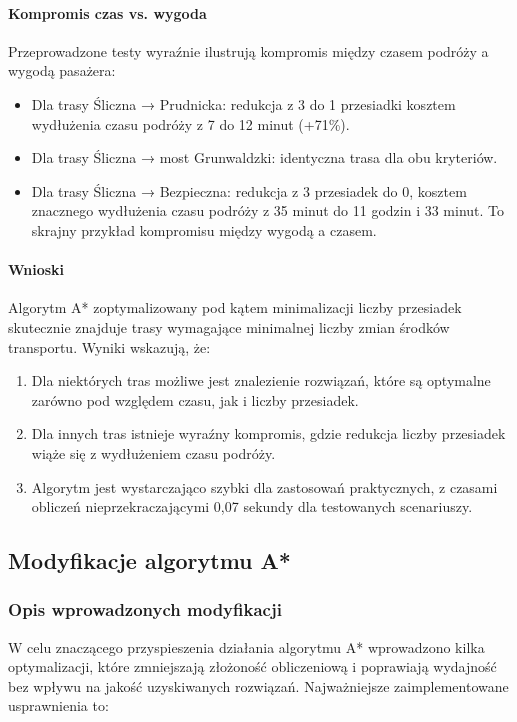 \documentclass[12pt,a4paper]{article}
\begin{document}
\paragraph{Kompromis czas vs. wygoda}
Przeprowadzone testy wyraźnie ilustrują kompromis między czasem podróży a wygodą pasażera:

\begin{itemize}
    \item Dla trasy Śliczna → Prudnicka: redukcja z 3 do 1 przesiadki kosztem wydłużenia czasu podróży z 7 do 12 minut (+71\%).
    \item Dla trasy Śliczna → most Grunwaldzki: identyczna trasa dla obu kryteriów.
    \item Dla trasy Śliczna → Bezpieczna: redukcja z 3 przesiadek do 0, kosztem znacznego wydłużenia czasu podróży z 35 minut do 11 godzin i 33 minut. To skrajny przykład kompromisu między wygodą a czasem.
\end{itemize}

\paragraph{Wnioski}
Algorytm A* zoptymalizowany pod kątem minimalizacji liczby przesiadek skutecznie znajduje trasy wymagające minimalnej liczby zmian środków transportu. Wyniki wskazują, że:

\begin{enumerate}
    \item Dla niektórych tras możliwe jest znalezienie rozwiązań, które są optymalne zarówno pod względem czasu, jak i liczby przesiadek.
    \item Dla innych tras istnieje wyraźny kompromis, gdzie redukcja liczby przesiadek wiąże się z wydłużeniem czasu podróży.
    \item Algorytm jest wystarczająco szybki dla zastosowań praktycznych, z czasami obliczeń nieprzekraczającymi 0,07 sekundy dla testowanych scenariuszy.
\end{enumerate}

\subsection{Modyfikacje algorytmu A*}
\subsubsection{Opis wprowadzonych modyfikacji}
W celu znaczącego przyspieszenia działania algorytmu A* wprowadzono kilka optymalizacji, które zmniejszają złożoność obliczeniową i poprawiają wydajność bez wpływu na jakość uzyskiwanych rozwiązań. Najważniejsze zaimplementowane usprawnienia to:
\end{document}
